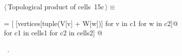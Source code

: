 \documentclass[11pt,oneside]{article}	%
\begin{document}
\begin{flushleft} \small
\begin{minipage}{\linewidth} \label{scrap22}
\protect{}$\langle\,$Topological product of cells\nobreak\ {\footnotesize 15c}$\,\rangle\equiv$
\vspace{-1ex}
\begin{list}{}{} \item
\mbox{}\verb@cells = [ [vertices[tuple(V[v] + W[w])] for v in c1 for w in c2]@\\
\mbox{}\verb@         for c1 in cells1 for c2 in cells2]  @{\NWsep}
\end{list}
\vspace{-1ex}
\footnotesize\addtolength{\baselineskip}{-1ex}
\begin{list}{}{\setlength{\itemsep}{-\parsep}\setlength{\itemindent}{-\leftmargin}}
\item \NWtxtMacroRefIn\ .
\end{list}
\end{minipage}\\[4ex]
\end{flushleft}
\end{document}
